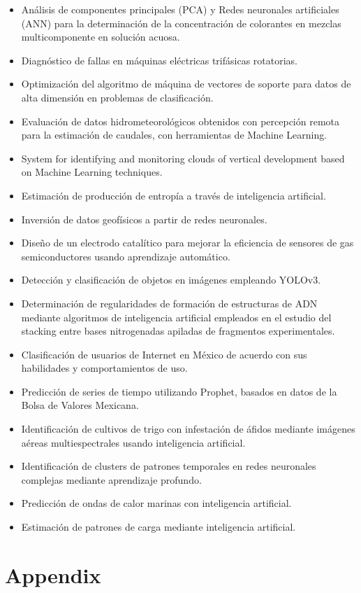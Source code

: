 \documentclass{tufte-handout}
\begin{document}
\begin{itemize}
\item Análisis de componentes principales (PCA) y Redes neuronales artificiales (ANN) para la determinación de la concentración de colorantes en mezclas multicomponente en solución acuosa.
\item Diagnóstico de fallas en máquinas eléctricas trifásicas rotatorias.
\item Optimización del algoritmo de máquina de vectores de soporte para datos de alta dimensión en problemas de clasificación.
\item Evaluación de datos hidrometeorológicos obtenidos con percepción remota para la estimación de caudales, con herramientas de Machine Learning.
\item System for identifying and monitoring clouds of vertical development based on Machine Learning techniques.
\item Estimación de producción de entropía a través de inteligencia artificial.
\item Inversión de datos geofísicos a partir de redes neuronales.
\item Diseño de un electrodo catalítico para mejorar la eficiencia de sensores de gas semiconductores usando aprendizaje automático.
\item Detección y clasificación de objetos en imágenes empleando YOLOv3.
\item Determinación de regularidades de formación de estructuras de ADN mediante algoritmos de inteligencia artificial empleados en el estudio del stacking entre bases nitrogenadas apiladas de fragmentos experimentales.
\item Clasificación de usuarios de Internet en México de acuerdo con sus habilidades y comportamientos de uso.
\item Predicción de series de tiempo utilizando Prophet, basados en datos de la Bolsa de Valores Mexicana.
\item Identificación de cultivos de trigo con infestación de áfidos mediante imágenes aéreas multiespectrales usando inteligencia artificial.
\item Identificación de clusters de patrones temporales en redes neuronales complejas mediante aprendizaje profundo.
\item Predicción de ondas de calor marinas con inteligencia artificial. 
\item Estimación de patrones de carga mediante inteligencia artificial.
\end{itemize}


\section{Appendix}
\end{document}
